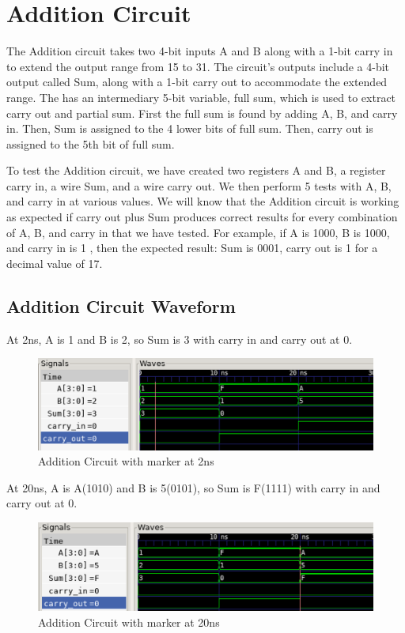 \documentclass[12pt]{article}
\begin{document}
\section{Addition Circuit}
The Addition circuit takes two 4-bit inputs A and B along with a 1-bit carry in to extend the output range from 15 to 31. The circuit’s outputs include  a 4-bit output called Sum, along with a 1-bit carry out to accommodate the extended range. The has an intermediary 5-bit variable, full sum, which is used to extract carry out and partial sum. First the full sum is found by adding A, B, and carry in. Then, Sum is assigned to the 4 lower bits of full sum. Then, carry out is assigned to the 5th bit of full sum. 


To test the Addition circuit, we have created two registers A and B, a register carry in, a wire Sum, and a wire carry out. We then perform 5 tests with A, B, and carry in at various values. We will know that the Addition circuit is working as expected if carry out plus Sum produces correct results for every combination of A, B, and carry in that we have tested. For example, if A is 1000, B is 1000, and carry in is 1 , then the expected result: Sum is 0001, carry out is 1 for a decimal value of 17.

\subsection{Addition Circuit Waveform} 

At 2ns, A is 1 and B is 2, so Sum is 3 with  carry in and carry out at 0.

\begin{figure}[H]
 \centering
 \includegraphics[width = 1.0\textwidth]{Addition/addition_wave.png}
 \caption{Addition Circuit with marker at 2ns}
 \label{fig:enter-label} 
\end{figure} 

At 20ns, A is A(1010) and B is 5(0101), so Sum is F(1111) with carry in and carry out at 0.
 \begin{figure}[H]
 \centering 
\includegraphics[width = 1.0\textwidth]{Addition/addition_wave1.png}
 \caption{Addition Circuit with marker at 20ns}
 \label{fig:enter-label}
 \end{figure}
\end{document}
